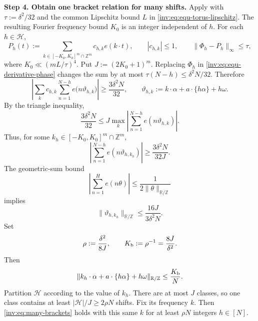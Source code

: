 \documentclass[twoside]{aomart}
\makeatletter
\theoremstyle{paperplain}
\theoremstyle{paperdefinition}
\renewenvironment{proof}[1][\proofname]{\par\pushQED{\qed}%
  \normalfont\topsep6\p@\@plus3\p@\relax\trivlist
  \item[\hskip\labelsep\itshape #1\@addpunct{.}]\ignorespaces
}{\popQED\endtrivlist\@endpefalse}
\numberwithin{equation}{section}
\makeatother
\begin{document}
\begin{proof}
\par
\medskip
\noindent\textbf{Step 4. Obtain one bracket relation for many shifts.}
Apply  with
$\tau:=\delta^2/32$ and the common Lipschitz bound $L$ in \eqref{inv:eq:equ-torus-lipschitz}.
The resulting Fourier frequency bound $K_0$ is an integer independent of $h$. For each
$h\in\mathcal H$,
\begin{equation*}
 P_h(t):=\sum_{k\in[-K_0,K_0]^m\cap\mathbb Z^m}
 c_{h,k}e(k\cdot t),\qquad
 |c_{h,k}|\le1,\qquad
 \|\Phi_h-P_h\|_\infty\le\tau,
\end{equation*}
where $K_0\ll(mL/\tau)^4$. Put $J:=(2K_0+1)^m$.
Replacing $\Phi_h$ in \eqref{inv:eq:equ-derivative-phase} changes the sum by at most
$\tau(N-h)\le\delta^2N/32$. Therefore
\begin{equation*}
 \left|\sum_k c_{h,k}\sum_{n=1}^{N-h}
 e\bigl(n\vartheta_{h,k}\bigr)\right|
 \ge\frac{3\delta^2N}{32},
 \qquad
 \vartheta_{h,k}:=k\cdot\alpha+a\cdot\{h\alpha\}+h\omega.
\end{equation*}
By the triangle inequality,
 \begin{equation*}
 \frac{3\delta^2N}{32}
 \le J\max_k\left|\sum_{n=1}^{N-h}
 e(n\vartheta_{h,k})\right|.
\end{equation*}
Thus, for some $k_h\in[-K_0,K_0]^m\cap\mathbb Z^m$,
\begin{equation*}
 \left|\sum_{n=1}^{N-h}e(n\vartheta_{h,k_h})\right|
 \ge\frac{3\delta^2N}{32J}.
\end{equation*}
The geometric-sum bound
 \begin{equation*}
 \left|\sum_{n=1}^{H}e(n\theta)\right|
 \le\frac1{2\|\theta\|_{\mathbb R/\mathbb Z}}
\end{equation*}
implies
 \begin{equation*}
 \|\vartheta_{h,k_h}\|_{\mathbb R/\mathbb Z}
 \le\frac{16J}{3\delta^2N}.
\end{equation*}
Set
\begin{equation*}
 \rho:=\frac{\delta^2}{8J},\qquad
 K_{\rm b}:=\rho^{-1}=\frac{8J}{\delta^2}.
\end{equation*}
Then
\begin{equation}
 \|k_h\cdot\alpha+a\cdot\{h\alpha\}+h\omega\|_{\mathbb R/\mathbb Z}
 \le\frac{K_{\rm b}}N.
\label{inv:eq:many-brackets}
\end{equation}
Partition $\mathcal H$ according to the value of $k_h$. There are at
most $J$ classes, so one class contains at least
$|\mathcal H|/J\ge2\rho N$ shifts. Fix its frequency $k$. Then
\eqref{inv:eq:many-brackets} holds with this same $k$ for at least $\rho N$ integers
$h\in[N]$.


\end{proof}
\end{document}
